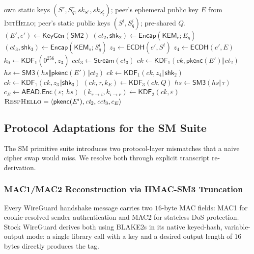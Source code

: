 \documentclass{SCIS2026}
\newcommand{\initmsg}{\textsc{InitHello}\xspace}
\newcommand{\respmsg}{\textsc{RespHello}\xspace}
\newcommand{\concat}{\mathbin{\Vert}}
\newcommand{\KDF}{\mathsf{KDF}}
\newcommand{\AEAD}{\mathsf{AEAD}}
\newcommand{\KEMs}{\textsf{KEM}_s}
\newcommand{\KEMe}{\textsf{KEM}_e}
\newcommand{\ECDH}{\mathsf{ECDH}}
\newcommand{\Encap}{\mathsf{Encap}}
\newcommand{\KeyGen}{\mathsf{KeyGen}}
\newcommand{\pkenc}{\mathsf{pkenc}}
\begin{document}
\begin{algorithm}[htbp]
\caption{\respmsg\ construction (responder $r$).}
\label{alg:resp}
\begin{algorithmic}[1]
\REQUIRE own static keys $(S^r, S^r_q, \mathit{sk}_{S^r}, \mathit{sk}_{S^r_q})$;
peer's ephemeral public key $E$ from \initmsg;
peer's static public keys $(S^i, S^i_q)$; pre-shared $Q$.
\STATE $(E', e') \gets \KeyGen(\textsf{SM2})$
\STATE $(\textit{ct}_2, \textsf{shk}_2) \gets \Encap(\KEMe; E_q)$
\STATE $(\textit{ct}_3, \textsf{shk}_3) \gets \Encap(\KEMs; S^i_q)$
\STATE $z_3 \gets \ECDH(e', S^i)$
\STATE $z_4 \gets \ECDH(e', E)$
\STATE $k_0 \gets \KDF_1(0^{256}, z_3)$
\STATE $\textit{cct}_3 \gets \mathsf{Stream}(\textit{ct}_3)$
\STATE $ck \gets \KDF_1(ck, \pkenc(E') \concat \textit{ct}_2)$
\STATE $hs \gets \textsf{SM3}(hs \concat \pkenc(E') \concat \textit{ct}_2)$
\STATE $ck \gets \KDF_1(ck, z_4 \concat \textsf{shk}_2)$
\STATE $ck \gets \KDF_1(ck, z_3 \concat \textsf{shk}_3)$
\STATE $(ck, \tau, k_E) \gets \KDF_3(ck, Q)$
\STATE $hs \gets \textsf{SM3}(hs \concat \tau)$
\STATE $c_E \gets \AEAD.\mathsf{Enc}(\varepsilon;\ hs)$
\STATE $(k_{r\to i}, k_{i\to r}) \gets \KDF_2(ck, \varepsilon)$
\STATE \RETURN $\respmsg = \langle \pkenc(E'), \textit{ct}_2,
       \textit{cct}_3, c_E\rangle$
\end{algorithmic}
\end{algorithm}

\subsection{Protocol Adaptations for the SM Suite}
\label{sec:adaptations}

The SM primitive suite introduces two protocol-layer mismatches that
a naive cipher swap would miss.  We resolve both through explicit
transcript re-derivation.

\subsubsection{MAC1/MAC2 Reconstruction via HMAC-SM3 Truncation}
\label{sec:macreconstruct}

Every WireGuard handshake message carries two $16$-byte MAC fields:
MAC1 for cookie-resolved sender authentication and MAC2 for
stateless DoS protection.  Stock WireGuard derives both using
BLAKE2s in its native keyed-hash, variable-output mode: a single
library call with a key and a desired output length of $16$ bytes
directly produces the tag.
\end{document}
